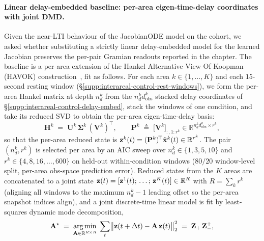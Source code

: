 \paragraph{Linear delay-embedded baseline: per-area eigen-time-delay coordinates with joint DMD.}
Given the near-LTI behaviour of the JacobianODE model on the cohort, we asked whether substituting a strictly linear delay-embedded model for the learned Jacobian preserves the per-pair Gramian readouts reported in the chapter. The baseline is a per-area extension of the Hankel Alternative View Of Koopman (HAVOK) construction~\cite{Brunton2017-kv,H_Tu2014-vj}, fit as follows. For each area $k\in\{1,\ldots,K\}$ and each $15$-second resting window (\S\ref{supp:interareal-control-rest-windows}), we form the per-area Hankel matrix at depth $n_{d}^{k}$ from the $n_{d}^{k} d_{\mathrm{obs}}^{k}$ stacked delay coordinates of \S\ref{supp:interareal-control-delay-embed}, stack the windows of one condition, and take its reduced SVD to obtain the per-area eigen-time-delay basis:
\begin{equation}
\mathbf{H}^{k} \;=\; \mathbf{U}^{k}\,\mathbf{\Sigma}^{k}\,(\mathbf{V}^{k})^{\!\top},\qquad
\mathbf{P}^{k}\;\triangleq\;\bigl[\mathbf{V}^{k}\bigr]_{:,1:r^{k}}\in\mathbb{R}^{n_{d}^{k} d_{\mathrm{obs}}^{k}\times r^{k}},\label{eq:supp-interareal-control-lin-svd}
\end{equation}
so that the per-area reduced state is $\vb{z}^{k}(t)=(\mathbf{P}^{k})^{\!\top}\tilde{\vb{x}}^{k}(t)\in\mathbb{R}^{r^{k}}$. The pair $(n_{d}^{k},r^{k})$ is selected per area by an AIC sweep over $n_{d}^{k}\in\{1,3,5,10\}$ and $r^{k}\in\{4,8,16,\ldots,600\}$ on held-out within-condition windows ($80/20$ window-level split, per-area obs-space prediction error). Reduced states from the $K$ areas are concatenated to a joint state $\vb{z}(t)=[\vb{z}^{1}(t);\,\ldots;\,\vb{z}^{K}(t)]\in\mathbb{R}^{R}$ with $R=\sum_{k}r^{k}$ (aligning all windows to the maximum $n_{d}^{k}-1$ leading offset so the per-area snapshot indices align), and a joint discrete-time linear model is fit by least-squares dynamic mode decomposition,
\begin{equation}
\mathbf{A}^{\star} \;=\; \mathop{\mathrm{arg\,min}}_{\mathbf{A}\in\mathbb{R}^{R\times R}}\;\sum_{t}\bigl\|\vb{z}(t+\Delta t)-\mathbf{A}\,\vb{z}(t)\bigr\|_{2}^{2}\;=\;\mathbf{Z}_{+}\,\mathbf{Z}_{-}^{+},\label{eq:supp-interareal-control-lin-dmd}
\end{equation}
